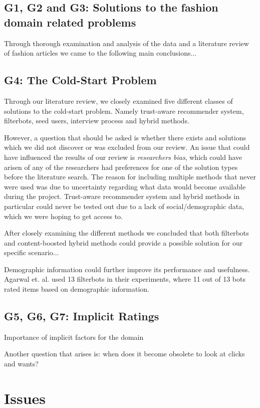 \subsection{G1, G2 and G3: Solutions to the fashion domain related problems}
\label{sec:fashion-discussion}

Through thorough examination and analysis of the data and a literature review of fashion articles we came to the following main conclusions...


\subsection{G4: The Cold-Start Problem}
\label{sec:cold-start-discussion}

Through our literature review, we closely examined five different classes of solutions to the cold-start problem. Namely trust-aware recommender system, filterbots, seed users, interview process and hybrid methods.

However, a question that should be asked is whether there exists and solutions which we did not discover or was excluded from our review. An issue that could have influenced the results of our review is \emph{researchers bias}, which could have arisen of any of the researchers had preferences for one of the solution types before the literature search. The reason for including multiple methods that never were used was due to uncertainty regarding what data would become available during the project. Trust-aware recommender system and hybrid methods in particular could never be tested out due to a lack of social/demographic data, which we were hoping to get access to.



After closely examining the different methods we concluded that both filterbots and content-boosted hybrid methods could provide a possible solution for
our specific scenario...

Demographic information could further improve its performance and usefulness. Agarwal et. al. \cite{Agarwal2009} used 13 filterbots in their experiments, where 11 out of 13 bots rated items based on demographic information.


\subsection{G5, G6, G7: Implicit Ratings}
\label{sec:implicit-discussion}

Importance of implicit factors for the domain

Another question that arises is: when does it become obsolete to look at clicks and wants?







\section{Issues}\label{sec:issues}

